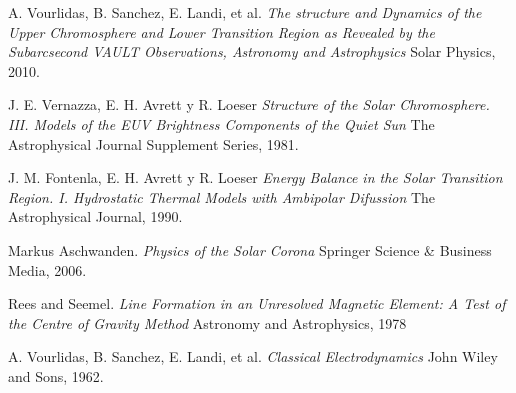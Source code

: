 \documentclass[9pt]{book}
\begin{document}
\begin{thebibliography}{9}

A. Vourlidas, B. Sanchez, E. Landi, et al.
\textit{The structure and Dynamics of the Upper Chromosphere and Lower Transition Region as Revealed by the Subarcsecond VAULT Observations, Astronomy and Astrophysics} 
Solar Physics, 2010.

J. E. Vernazza, E. H. Avrett y R. Loeser
\textit{Structure of the Solar Chromosphere. III. Models of the EUV Brightness Components of the Quiet Sun} 
The Astrophysical Journal Supplement Series, 1981.

J. M. Fontenla, E. H. Avrett y R. Loeser
\textit{Energy Balance in the Solar Transition Region. I. Hydrostatic Thermal Models with Ambipolar Difussion} 
The Astrophysical Journal, 1990.

Markus Aschwanden. 
\textit{Physics of the Solar Corona} 
Springer Science \& Business Media, 2006.

Rees and Seemel.
\textit{Line Formation in an Unresolved Magnetic Element: A Test of the Centre of Gravity Method} 
Astronomy and Astrophysics, 1978

A. Vourlidas, B. Sanchez, E. Landi, et al.
\textit{Classical Electrodynamics} 
John Wiley and Sons, 1962.


\end{thebibliography}
\end{document}

